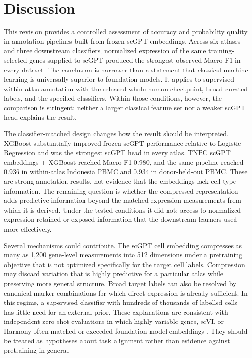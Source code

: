 \section{Discussion}

This revision provides a controlled assessment of accuracy and probability quality in annotation pipelines built from frozen scGPT embeddings. Across six atlases and three downstream classifiers, normalized expression of the same training-selected genes supplied to scGPT produced the strongest observed Macro F1 in every dataset. The conclusion is narrower than a statement that classical machine learning is universally superior to foundation models. It applies to supervised within-atlas annotation with the released whole-human checkpoint, broad curated labels, and the specified classifiers. Within those conditions, however, the comparison is stringent: neither a larger classical feature set nor a weaker scGPT head explains the result.

The classifier-matched design changes how the result should be interpreted. XGBoost substantially improved frozen-scGPT performance relative to Logistic Regression and was the strongest scGPT head in every atlas. TNBC scGPT embeddings + XGBoost reached Macro F1 0.980, and the same pipeline reached 0.936 in within-atlas Indonesia PBMC and 0.934 in donor-held-out PBMC. These are strong annotation results, not evidence that the embeddings lack cell-type information. The remaining question is whether the compressed representation adds predictive information beyond the matched expression measurements from which it is derived. Under the tested conditions it did not: access to normalized expression retained or exposed information that the downstream learners used more effectively.

Several mechanisms could contribute. The scGPT cell embedding compresses as many as 1,200 gene-level measurements into 512 dimensions under a pretraining objective that is not optimized specifically for the target cell labels. Compression may discard variation that is highly predictive for a particular atlas while preserving more general structure. Broad target labels can also be resolved by canonical marker combinations for which direct expression is already sufficient. In this regime, a supervised classifier with hundreds of thousands of labelled cells has little need for an external prior. These explanations are consistent with independent zero-shot evaluations in which highly variable genes, scVI, or Harmony often matched or exceeded foundation-model embeddings \citep{Kedzierska2025}. They should be treated as hypotheses about task alignment rather than evidence against pretraining in general.

